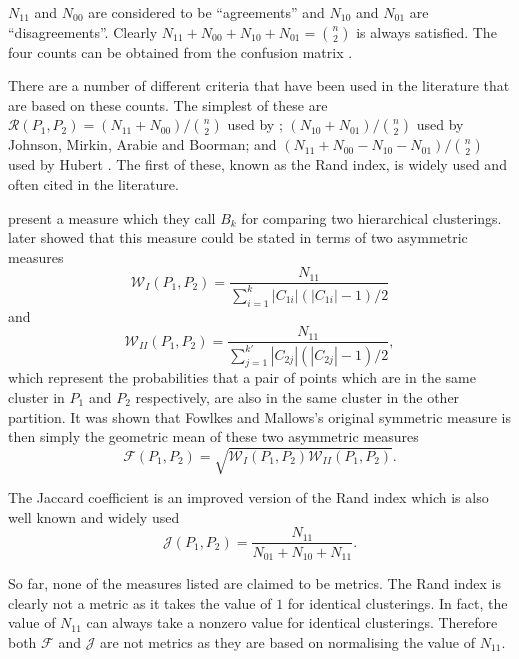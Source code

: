 \documentclass[a4paper]{report}
\begin{document}
$N_{11}$ and $N_{00}$ are considered to be ``agreements'' and $N_{10}$ and
$N_{01}$ are ``disagreements''.  Clearly $N_{11} + N_{00} + N_{10} + N_{01} =
\binom{n}{2}$ is always satisfied.  The four counts can be obtained from the
confusion matrix \citep{fowlkes-mallows-1983}.

There are a number of different criteria that have been used in the literature
that are based on these counts.  The simplest of these are
$\mathcal{R}(P_1,P_2) = (N_{11}+N_{00})/\binom{n}{2}$ used by
\citet{rand-1971}; $(N_{10}+N_{01})/\binom{n}{2}$ used by Johnson, Mirkin,
Arabie and Boorman; and $(N_{11}+N_{00}-N_{10}-N_{01})/\binom{n}{2}$ used by
Hubert \citep{hubert-arabie-1985}.  The first of these, known as the Rand
index, is widely used and often cited in the literature.

\citet{fowlkes-mallows-1983} present a measure which they call $B_k$ for
comparing two hierarchical clusterings.  \citet{wallace-1983} later showed
that this measure could be stated in terms of two asymmetric measures
\begin{equation*}
  \mathcal{W}_{I}(P_1,P_2) = \frac{N_{11}}{\sum_{i=1}^{k}
    |C_{1i}|(|C_{1i}|-1)/2}
\end{equation*}
and
\begin{equation*}
  \mathcal{W}_{II}(P_1,P_2) = \frac{N_{11}}{\sum_{j=1}^{k'}
    |C_{2j}|(|C_{2j}|-1)/2},
\end{equation*}
which represent the probabilities that a pair of points which are in the same
cluster in $P_1$ and $P_2$ respectively, are also in the same cluster in the
other partition.  It was shown that Fowlkes and Mallows's original symmetric
measure is then simply the geometric mean of these two asymmetric measures
\citep{wallace-1983}
\begin{equation*}
  \mathcal{F}(P_1,P_2) = \sqrt{\mathcal{W}_{I}(P_1,P_2)\mathcal{W}_{II}(P_1,P_2)}.
\end{equation*}

The Jaccard coefficient \citep{ben-hur-2001} is an improved version of the
Rand index which is also well known and widely used
\begin{equation*}
  \mathcal{J}(P_1,P_2) = \frac{N_{11}}{N_{01}+N_{10}+N_{11}}.
\end{equation*}

So far, none of the measures listed are claimed to be metrics.  The Rand index
is clearly not a metric as it takes the value of $1$ for identical
clusterings.  In fact, the value of $N_{11}$ can always take a nonzero value
for identical clusterings.  Therefore both $\mathcal{F}$ and $\mathcal{J}$ are
not metrics as they are based on normalising the value of $N_{11}$.
\end{document}
